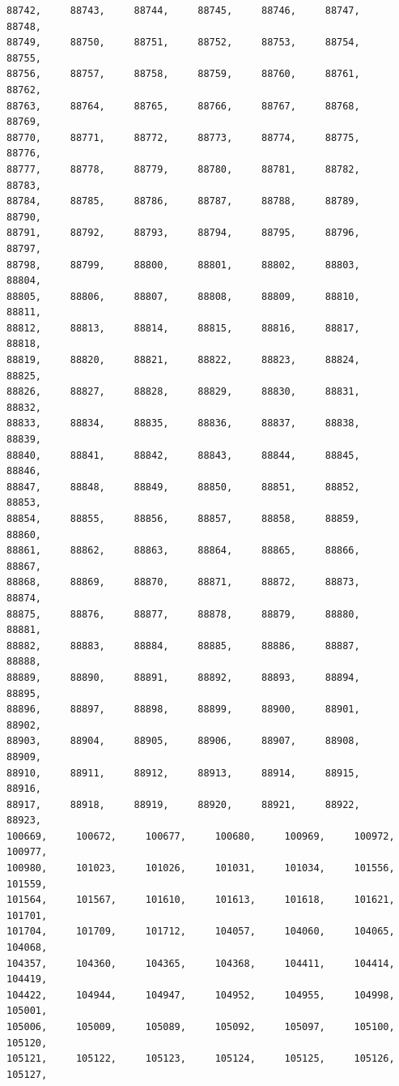 \documentclass[a4paper,11pt]{report}
\begin{document}
\begin{verbatim}
88742,     88743,     88744,     88745,     88746,     88747,     88748,     
88749,     88750,     88751,     88752,     88753,     88754,     88755,     
88756,     88757,     88758,     88759,     88760,     88761,     88762,     
88763,     88764,     88765,     88766,     88767,     88768,     88769,     
88770,     88771,     88772,     88773,     88774,     88775,     88776,     
88777,     88778,     88779,     88780,     88781,     88782,     88783,     
88784,     88785,     88786,     88787,     88788,     88789,     88790,     
88791,     88792,     88793,     88794,     88795,     88796,     88797,     
88798,     88799,     88800,     88801,     88802,     88803,     88804,     
88805,     88806,     88807,     88808,     88809,     88810,     88811,     
88812,     88813,     88814,     88815,     88816,     88817,     88818,     
88819,     88820,     88821,     88822,     88823,     88824,     88825,     
88826,     88827,     88828,     88829,     88830,     88831,     88832,     
88833,     88834,     88835,     88836,     88837,     88838,     88839,     
88840,     88841,     88842,     88843,     88844,     88845,     88846,     
88847,     88848,     88849,     88850,     88851,     88852,     88853,     
88854,     88855,     88856,     88857,     88858,     88859,     88860,     
88861,     88862,     88863,     88864,     88865,     88866,     88867,     
88868,     88869,     88870,     88871,     88872,     88873,     88874,     
88875,     88876,     88877,     88878,     88879,     88880,     88881,     
88882,     88883,     88884,     88885,     88886,     88887,     88888,     
88889,     88890,     88891,     88892,     88893,     88894,     88895,     
88896,     88897,     88898,     88899,     88900,     88901,     88902,     
88903,     88904,     88905,     88906,     88907,     88908,     88909,     
88910,     88911,     88912,     88913,     88914,     88915,     88916,     
88917,     88918,     88919,     88920,     88921,     88922,     88923,     
100669,     100672,     100677,     100680,     100969,     100972,     100977,
100980,     101023,     101026,     101031,     101034,     101556,     101559,
101564,     101567,     101610,     101613,     101618,     101621,     101701,
101704,     101709,     101712,     104057,     104060,     104065,     104068,
104357,     104360,     104365,     104368,     104411,     104414,     104419,
104422,     104944,     104947,     104952,     104955,     104998,     105001,
105006,     105009,     105089,     105092,     105097,     105100,     105120,
105121,     105122,     105123,     105124,     105125,     105126,     105127,

\end{verbatim}
\end{document}
